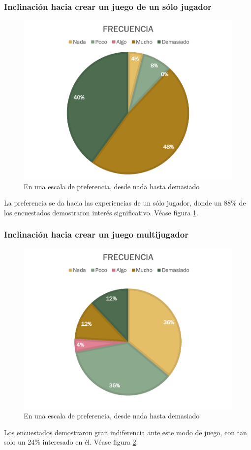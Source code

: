 \documentclass[]{article}
\begin{document}
\subsubsection{Inclinaci\'on hacia crear un juego de un s\'olo jugador}
\begin{figure}[H]
	
	\centering
	\includegraphics[width=1\textwidth]{Encuesta_tipo_solo}
	\caption{En una escala de preferencia, desde nada hasta demasiado} 
	\label{SOLO}
	
\end{figure}
La preferencia se da hacia las experiencias de un s\'olo jugador, donde un 88\% de los encuestados demostraron inter\'es significativo. V\'ease figura \ref{SOLO}.
\subsubsection{Inclinaci\'on hacia crear un juego multijugador}
\begin{figure}[H]
	
	\centering
	\includegraphics[width=1\textwidth]{Encuesta_tipo_multi}
	\caption{En una escala de preferencia, desde nada hasta demasiado} 
	\label{MULTI}
	
\end{figure}
Los encuestados demostraron gran indiferencia ante este modo de juego, con tan solo un 24\% interesado en \'el. V\'ease figura \ref{MULTI}.
\end{document}
